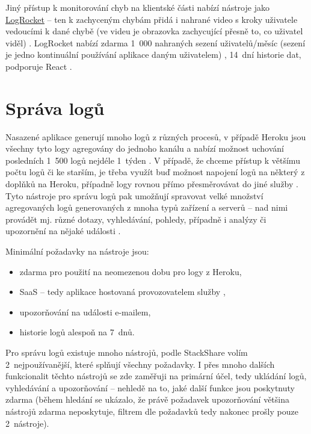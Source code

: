 Jiný přístup k monitorování chyb na klientské části nabízí nástroje jako \href{https://logrocket.com/}{LogRocket} -- ten k zachyceným chybám přidá i nahrané video s kroky uživatele vedoucími k dané chybě (ve videu je obrazovka zachycující přesně to, co uživatel viděl) \cite{logrocket}. LogRocket nabízí zdarma 1~000 nahraných sezení uživatelů/měsíc (sezení je jedno kontinuální používání aplikace daným uživatelem) \cite{logrocket-pricing}, 14~dní historie dat, podporuje React \cite{logrocket-react}.

\section{Správa logů}\label{sec:spravalogu}
Nasazené aplikace generují mnoho logů z různých procesů, v případě Heroku jsou všechny tyto logy agregovány do jednoho kanálu a nabízí možnost uchování posledních 1~500 logů nejdéle 1~týden \cite{tools-logs1}. V případě, že chceme přístup k většímu počtu logů či ke starším, je třeba využít buď možnost napojení logů na některý z doplňků na Heroku, případně logy rovnou přímo přesměrovávat do jiné služby \cite{tools-logs1}. Tyto nástroje pro správu logů pak umožňují spravovat velké množství agregovaných logů generovaných z mnoha typů zařízení a serverů -- nad nimi provádět mj. různé dotazy, vyhledávání, pohledy, případně i analýzy či upozornění na nějaké události \cite{tools-logs2}.

Minimální požadavky na nástroje jsou:
\begin{itemize}
    \item zdarma pro použití na neomezenou dobu pro logy z Heroku,
    \item SaaS -- tedy aplikace hostovaná provozovatelem služby \cite{oracle-saas},
    \item upozorňování na události e-mailem,
    \item historie logů alespoň na 7~dnů.
\end{itemize}

Pro správu logů existuje mnoho nástrojů, podle StackShare \cite{stackshare-log} volím 2~nejpoužívanější, které splňují všechny požadavky. I přes mnoho dalších funkcionalit těchto nástrojů se zde zaměřuji na primární účel, tedy ukládání logů, vyhledávání a upozorňování -- nehledě na to, jaké další funkce jsou poskytnuty zdarma (během hledání se ukázalo, že právě požadavek upozorňování většina nástrojů zdarma neposkytuje, filtrem dle požadavků tedy nakonec prošly pouze 2~nástroje).

